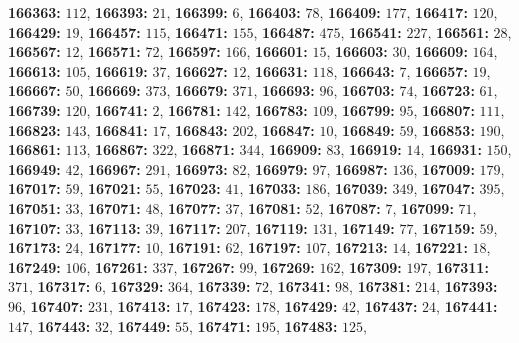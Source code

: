 \textsf{\bfseries 166363:} $112$, \textsf{\bfseries 166393:} $21$, \textsf{\bfseries 166399:} $6$, \textsf{\bfseries 166403:} $78$, \textsf{\bfseries 166409:} $177$, \textsf{\bfseries 166417:} $120$, \textsf{\bfseries 166429:} $19$, \textsf{\bfseries 166457:} $115$, \textsf{\bfseries 166471:} $155$, \textsf{\bfseries 166487:} $475$, \textsf{\bfseries 166541:} $227$, \textsf{\bfseries 166561:} $28$, \textsf{\bfseries 166567:} $12$, \textsf{\bfseries 166571:} $72$, \textsf{\bfseries 166597:} $166$, \textsf{\bfseries 166601:} $15$, \textsf{\bfseries 166603:} $30$, \textsf{\bfseries 166609:} $164$, \textsf{\bfseries 166613:} $105$, \textsf{\bfseries 166619:} $37$, \textsf{\bfseries 166627:} $12$, \textsf{\bfseries 166631:} $118$, \textsf{\bfseries 166643:} $7$, \textsf{\bfseries 166657:} $19$, \textsf{\bfseries 166667:} $50$, \textsf{\bfseries 166669:} $373$, \textsf{\bfseries 166679:} $371$, \textsf{\bfseries 166693:} $96$, \textsf{\bfseries 166703:} $74$, \textsf{\bfseries 166723:} $61$, \textsf{\bfseries 166739:} $120$, \textsf{\bfseries 166741:} $2$, \textsf{\bfseries 166781:} $142$, \textsf{\bfseries 166783:} $109$, \textsf{\bfseries 166799:} $95$, \textsf{\bfseries 166807:} $111$, \textsf{\bfseries 166823:} $143$, \textsf{\bfseries 166841:} $17$, \textsf{\bfseries 166843:} $202$, \textsf{\bfseries 166847:} $10$, \textsf{\bfseries 166849:} $59$, \textsf{\bfseries 166853:} $190$, \textsf{\bfseries 166861:} $113$, \textsf{\bfseries 166867:} $322$, \textsf{\bfseries 166871:} $344$, \textsf{\bfseries 166909:} $83$, \textsf{\bfseries 166919:} $14$, \textsf{\bfseries 166931:} $150$, \textsf{\bfseries 166949:} $42$, \textsf{\bfseries 166967:} $291$, \textsf{\bfseries 166973:} $82$, \textsf{\bfseries 166979:} $97$, \textsf{\bfseries 166987:} $136$, \textsf{\bfseries 167009:} $179$, \textsf{\bfseries 167017:} $59$, \textsf{\bfseries 167021:} $55$, \textsf{\bfseries 167023:} $41$, \textsf{\bfseries 167033:} $186$, \textsf{\bfseries 167039:} $349$, \textsf{\bfseries 167047:} $395$, \textsf{\bfseries 167051:} $33$, \textsf{\bfseries 167071:} $48$, \textsf{\bfseries 167077:} $37$, \textsf{\bfseries 167081:} $52$, \textsf{\bfseries 167087:} $7$, \textsf{\bfseries 167099:} $71$, \textsf{\bfseries 167107:} $33$, \textsf{\bfseries 167113:} $39$, \textsf{\bfseries 167117:} $207$, \textsf{\bfseries 167119:} $131$, \textsf{\bfseries 167149:} $77$, \textsf{\bfseries 167159:} $59$, \textsf{\bfseries 167173:} $24$, \textsf{\bfseries 167177:} $10$, \textsf{\bfseries 167191:} $62$, \textsf{\bfseries 167197:} $107$, \textsf{\bfseries 167213:} $14$, \textsf{\bfseries 167221:} $18$, \textsf{\bfseries 167249:} $106$, \textsf{\bfseries 167261:} $337$, \textsf{\bfseries 167267:} $99$, \textsf{\bfseries 167269:} $162$, \textsf{\bfseries 167309:} $197$, \textsf{\bfseries 167311:} $371$, \textsf{\bfseries 167317:} $6$, \textsf{\bfseries 167329:} $364$, \textsf{\bfseries 167339:} $72$, \textsf{\bfseries 167341:} $98$, \textsf{\bfseries 167381:} $214$, \textsf{\bfseries 167393:} $96$, \textsf{\bfseries 167407:} $231$, \textsf{\bfseries 167413:} $17$, \textsf{\bfseries 167423:} $178$, \textsf{\bfseries 167429:} $42$, \textsf{\bfseries 167437:} $24$, \textsf{\bfseries 167441:} $147$, \textsf{\bfseries 167443:} $32$, \textsf{\bfseries 167449:} $55$, \textsf{\bfseries 167471:} $195$, \textsf{\bfseries 167483:} $125$, 
